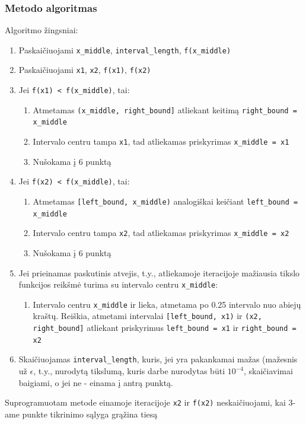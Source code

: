 \documentclass[lithuanian,a4paper,12pt]{article}
\newcommand{\mil}{\texttt}
\begin{document}
\subsubsection*{Metodo algoritmas}
Algoritmo žingsniai:
\begin{enumerate}
    \item Paskaičiuojami \mil{x_middle}, \mil{interval_length}, \mil{f(x_middle)}
    \item Paskaičiuojami \mil{x1}, \mil{x2}, \mil{f(x1)}, \mil{f(x2)}
    \item Jei \mil{f(x1) < f(x_middle)}, tai:
    \begin{enumerate}
        \item Atmetamas \mil{(x_middle, right_bound]} atliekant keitimą \mil{right_bound = x_middle}
        \item Intervalo centru tampa \mil{x1}, tad atliekamas priskyrimas \mil{x_middle = x1}
        \item Nušokama į 6 punktą
    \end{enumerate}
    \item Jei \mil{f(x2) < f(x_middle)}, tai:
    \begin{enumerate}
        \item Atmetamas \mil{[left_bound, x_middle)} analogiškai keičiant \mil{left_bound = x_middle}
        \item Intervalo centru tampa \mil{x2}, tad atliekamas priskyrimas \mil{x_middle = x2}
        \item Nušokama į 6 punktą
    \end{enumerate}
    \item Jei prieinamas paskutinis atvejis, t.y., atliekamoje iteracijoje mažiausia tikslo funkcijos reikšmė turima su intervalo centru \mil{x_middle}: 
    \begin{enumerate}
        \item Intervalo centru \mil{x_middle} ir lieka, atmetama po 0.25 intervalo nuo abiejų kraštų. Reiškia, atmetami intervalai \mil{[left_bound, x1)} ir \mil{(x2, right_bound]} atliekant priskyrimus \mil{left_bound = x1} ir \mil{right_bound = x2}
    \end{enumerate}
    \item Skaičiuojamas \mil{interval_length}, kuris, jei yra pakankamai mažas (mažesnis už 
    $\epsilon$, t.y., nurodytą tikslumą, kuris darbe nurodytas būti $10^{-4}$, skaičiavimai baigiami, o jei ne - einama į antrą punktą. 
\end{enumerate}

Suprogramuotam metode einamoje iteracijoje \mil{x2} ir \mil{f(x2)} neskaičiuojami, kai 3-ame punkte tikrinimo sąlyga grąžina tiesą
\end{document}
